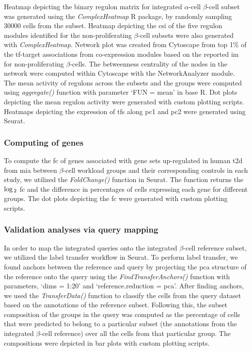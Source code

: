 \par Heatmap depicting the binary regulon matrix for integrated $\alpha$-cell $\beta$-cell subset was generated using the \textit{ComplexHeatmap} R package, by randomly sampling 30000 cells from the subset. Heatmap depicting the \gls{csi} of the five regulon modules identified for the non-proliferating $\beta$-cell subsets were also generated with \textit{ComplexHeatmap}. Network plot was created from Cytoscape \textbf{\cite{shannon_cytoscape_2003}} from top 1\%  of the \gls{tf}-target associations from co-expression modules based on the reported \gls{im} for non-proliferating $\beta$-cells. The betweenness centrality of the nodes in the network were computed within Cytoscape with the NetworkAnalyzer module. The mean activity of regulons across the subsets and the groups were computed using \textit{aggregate()} function with parameter `FUN = mean' in base R. Dot plots depicting the mean regulon activity were generated with custom plotting scripts. Heatmaps depicting the expression of \glspl{tf} along \gls{pc}1 and \gls{pc}2 were generated using Seurat.

\subsubsection{\large Computing  of genes}
\label{subsubsec:met_chp3_foldchanges}
To compute the \gls{fc} of genes associated with gene sets up-regulated in human \gls{t2d} from \gls{mia} between $\beta$-cell workload groups and their corresponding controls in each study, we utilized the \textit{FoldChange()} function in Seurat. The function returns the $\log\textsubscript{2}$ \gls{fc} and the difference in percentages of cells expressing each gene for different groups. The dot plots depicting the \gls{fc} were generated with custom plotting scripts. 

\subsubsection{\large Validation analyses via query mapping}
\label{subsubsec:met_chp3_validation}
In order to map the integrated queries onto the integrated $\beta$-cell reference subset, we utilized the label transfer workflow in Seurat. To perform label transfer, we found anchors between the reference and query by projecting the \gls{pca} structure of the reference onto the query using the \textit{FindTransferAnchors()} function with parameters, `dims = 1:20' and `reference.reduction = pca'. After finding anchors, we used the \textit{TransferData()} function to classify the cells from the query dataset based on the annotations of the reference subset. Following this, the subset composition of the groups in the query was computed as the percentage of cells that were predicted to belong to a particular subset (the annotations from the integrated $\beta$-cell reference) over all the cells from that particular group. The compositions were depicted in bar plots with custom plotting scripts.

